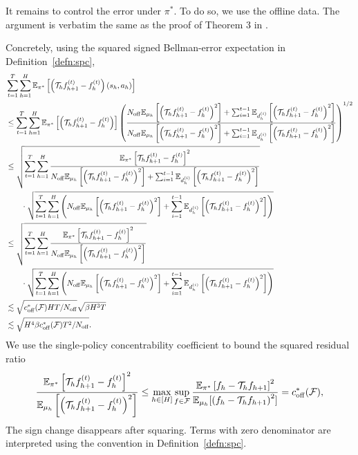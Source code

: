 It remains to control the error under $\pi^*$. To do so, we use the offline data. The argument is verbatim the same as the proof of Theorem 3 in \citet{tan2025actor}.

Concretely, using the squared signed Bellman-error expectation in Definition~\ref{defn:spc},
\begin{align*}
    &\sum_{t=1}^T \sum_{h=1}^H\mathbb{E}_{\pi^*}\left[\left({\mathcal{T}}_hf_{h+1}^{(t)} - f_h^{(t)}\right)\left(s_h, a_h\right)\right] \\ 
    &\leq \sum_{t=1}^T \sum_{h=1}^H \mathbb{E}_{\pi^*}\left[\left({\mathcal{T}}_hf_{h+1}^{(t)} - f_h^{(t)}\right)\right] \left(\frac{N_{{\operatorname{off}}}\mathbb{E}_{\mu_h}\left[\left({\mathcal{T}}_hf_{h+1}^{(t)} - f_h^{(t)}\right)^2\right] + \sum_{i=1}^{t-1}\mathbb{E}_{d_h^{(i)}}\left[\left({\mathcal{T}}_hf_{h+1}^{(t)} - f_h^{(t)}\right)^2\right]}{N_{{\operatorname{off}}}\mathbb{E}_{\mu_h}\left[\left({\mathcal{T}}_hf_{h+1}^{(t)} - f_h^{(t)}\right)^2\right] + \sum_{i=1}^{t-1}\mathbb{E}_{d_h^{(i)}}\left[\left({\mathcal{T}}_hf_{h+1}^{(t)} - f_h^{(t)}\right)^2\right]}\right)^{1/2} \\
    &\leq \sqrt{\sum_{t=1}^T\sum_{h=1}^H \frac{\mathbb{E}_{\pi^*}\left[{\mathcal{T}}_hf_{h+1}^{(t)} - f_h^{(t)}\right]^2}{N_{{\operatorname{off}}}\mathbb{E}_{\mu_h}\left[\left({\mathcal{T}}_hf_{h+1}^{(t)} - f_h^{(t)}\right)^2\right] + \sum_{i=1}^{t-1}\mathbb{E}_{d_h^{(i)}}\left[\left({\mathcal{T}}_hf_{h+1}^{(t)} - f_h^{(t)}\right)^2\right]}}\\
    &\qquad \cdot\sqrt{\sum_{t=1}^T\sum_{h=1}^H \left(N_{{\operatorname{off}}}\mathbb{E}_{\mu_h}\left[\left({\mathcal{T}}_hf_{h+1}^{(t)} - f_h^{(t)}\right)^2\right] + \sum_{i=1}^{t-1}\mathbb{E}_{d_h^{(i)}}\left[\left({\mathcal{T}}_hf_{h+1}^{(t)} - f_h^{(t)}\right)^2\right]\right)} \\
    &\leq \sqrt{\sum_{t=1}^T\sum_{h=1}^H \frac{\mathbb{E}_{\pi^*}\left[{\mathcal{T}}_hf_{h+1}^{(t)} - f_h^{(t)}\right]^2}{N_{{\operatorname{off}}}\mathbb{E}_{\mu_h}\left[\left({\mathcal{T}}_hf_{h+1}^{(t)} - f_h^{(t)}\right)^2\right]}}\\
    &\qquad \cdot\sqrt{\sum_{t=1}^T\sum_{h=1}^H \left(N_{{\operatorname{off}}}\mathbb{E}_{\mu_h}\left[\left({\mathcal{T}}_hf_{h+1}^{(t)} - f_h^{(t)}\right)^2\right] + \sum_{i=1}^{t-1}\mathbb{E}_{d_h^{(i)}}\left[\left({\mathcal{T}}_hf_{h+1}^{(t)} - f_h^{(t)}\right)^2\right]\right)} \\
    &\lesssim \sqrt{c_{{\operatorname{off}}}^*({\mathcal{F}})HT/N_{{\operatorname{off}}}}\sqrt{\beta H^3T} \\
    &\lesssim \sqrt{H^4\beta c_{{\operatorname{off}}}^*({\mathcal{F}}) T^2/N_{{\operatorname{off}}}}.
\end{align*}
We use the single-policy concentrability coefficient to bound the squared residual ratio $$\frac{\mathbb{E}_{\pi^*}\left[{\mathcal{T}}_hf_{h+1}^{(t)} - f_h^{(t)}\right]^2}{\mathbb{E}_{\mu_h}\left[\left({\mathcal{T}}_hf_{h+1}^{(t)} - f_h^{(t)}\right)^2\right]} \leq \max_{h\in[H]}\sup_{f \in {\mathcal{F}}} \frac{\mathbb{E}_{\pi^*}\left[f_h-{\mathcal{T}}_hf_{h+1} \right]^2}{\mathbb{E}_{\mu_h}[\left(f_h-{\mathcal{T}}_h f_{h+1}\right)^2]} = c_{{\operatorname{off}}}^*({\mathcal{F}}),$$
The sign change disappears after squaring. Terms with zero denominator are interpreted using the convention in Definition~\ref{defn:spc}.




